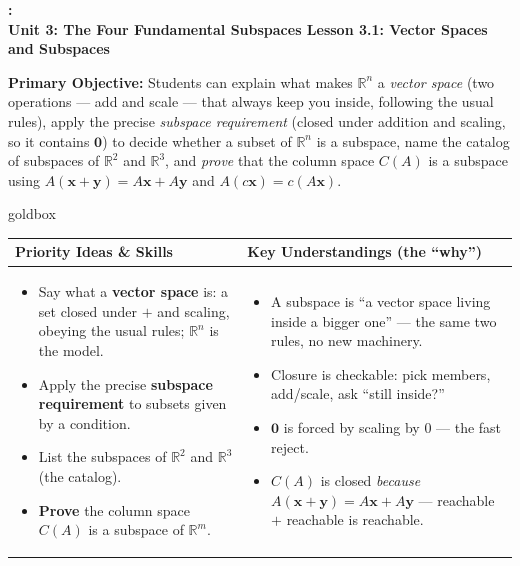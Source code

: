 \documentclass[10pt]{article}
\newcommand{\xx}{\mathbf{x}}
\newcommand{\yy}{\mathbf{y}}
\newcommand{\zero}{\mathbf{0}}
\newcommand{\UnitNumberName}{Unit 3: The Four Fundamental Subspaces \quad}
\newcommand{\LessonNumberName}{Lesson 3.1: Vector Spaces and Subspaces}
\begin{document}
\begin{center}
    {\Large\bfseries \CourseName: \SchoolYear \\
    {\small\bfseries \UnitNumberName \LessonNumberName}}
\end{center}

\begin{tcolorbox}[colback=blush, colframe=burgundy, boxrule=0.9pt, arc=2mm,
    left=2mm, right=2mm, top=1.5mm, bottom=1.5mm]
    \textbf{Primary Objective:} Students can explain what makes $\mathbb{R}^n$ a \emph{vector
    space} (two operations --- add and scale --- that always keep you inside, following the usual
    rules), apply the precise \emph{subspace requirement} (closed under addition and scaling, so it
    contains $\zero$) to decide whether a subset of $\mathbb{R}^n$ is a subspace, name the catalog
    of subspaces of $\mathbb{R}^2$ and $\mathbb{R}^3$, and \emph{prove} that the column space
    $C(A)$ is a subspace using $A(\xx+\yy)=A\xx+A\yy$ and $A(c\xx)=c(A\xx)$.
\end{tcolorbox}

\renewcommand{\arraystretch}{1.4}
\begin{skillbox}{goldbox}
\begin{tabularx}{\linewidth}{@{}X|X@{}}
\textbf{Priority Ideas \& Skills} & \textbf{Key Understandings (the ``why'')} \\[2pt]
\hline
\vspace{-6pt}
\begin{itemize}[leftmargin=1.1em, nosep, after=\vspace{2pt}]
  \item Say what a \textbf{vector space} is: a set closed under $+$ and scaling, obeying the usual rules; $\mathbb{R}^n$ is the model.
  \item Apply the precise \textbf{subspace requirement} to subsets given by a condition.
  \item List the subspaces of $\mathbb{R}^2$ and $\mathbb{R}^3$ (the catalog).
  \item \textbf{Prove} the column space $C(A)$ is a subspace of $\mathbb{R}^m$.
\end{itemize}
&
\vspace{-6pt}
\begin{itemize}[leftmargin=1.1em, nosep, after=\vspace{2pt}]
  \item A subspace is ``a vector space living inside a bigger one'' --- the same two rules, no new machinery.
  \item Closure is checkable: pick members, add/scale, ask ``still inside?''
  \item $\zero$ is forced by scaling by $0$ --- the fast reject.
  \item $C(A)$ is closed \emph{because} $A(\xx+\yy)=A\xx+A\yy$ --- reachable $+$ reachable is reachable.
\end{itemize}
\end{tabularx}
\end{skillbox}
\end{document}
